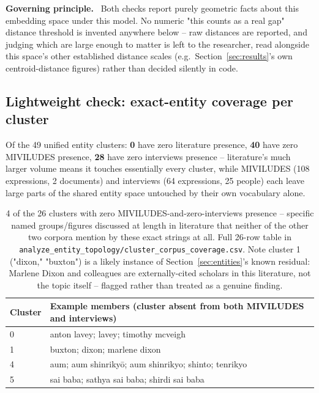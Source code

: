 \documentclass[11pt,a4paper]{article}
\newenvironment{plainbox}[1][Note]
  {\par\vspace{6pt}\noindent{\color{noteline}\rule{\linewidth}{0.6pt}}\par\vspace{3pt}
   \noindent\small\textbf{#1.}\ \ignorespaces}
  {\par\vspace{3pt}\noindent{\color{noteline}\rule{\linewidth}{0.6pt}}\vspace{6pt}\par}
\begin{document}
\begin{plainbox}[Governing principle]
Both checks report purely geometric facts about this embedding space
under this model. No numeric "this counts as a real gap" distance
threshold is invented anywhere below -- raw distances are reported, and
judging which are large enough to matter is left to the researcher,
read alongside this space's other established distance scales (e.g.\
Section~\ref{sec:results}'s own centroid-distance figures) rather than
decided silently in code.
\end{plainbox}

\subsection{Lightweight check: exact-entity coverage per cluster}

Of the 49 unified entity clusters: \textbf{0} have zero literature
presence, \textbf{40} have zero MIVILUDES presence, \textbf{28} have
zero interviews presence -- literature's much larger volume means it
touches essentially every cluster, while MIVILUDES (108 expressions, 2
documents) and interviews (64 expressions, 25 people) each leave large
parts of the shared entity space untouched by their own vocabulary
alone.

\begin{table}[h!]
\centering
\small
\begin{tabular}{p{0.7cm}p{9.5cm}}
\toprule
Cluster & Example members (cluster absent from both MIVILUDES and interviews) \\
\midrule
0 & anton lavey; lavey; timothy mcveigh \\
1 & buxton; dixon; marlene dixon \\
4 & aum; aum shinriky\={o}; aum shinrikyo; shinto; tenrikyo \\
5 & sai baba; sathya sai baba; shirdi sai baba \\
\bottomrule
\end{tabular}
\caption{4 of the 26 clusters with zero MIVILUDES-and-zero-interviews
presence -- specific named groups/figures discussed at length in
literature that neither of the other two corpora mention by these exact
strings at all. Full 26-row table in
\texttt{analyze\_entity\_topology/cluster\_corpus\_coverage.csv}. Note
cluster 1 ("dixon," "buxton") is a likely instance of
Section~\ref{sec:entities}'s known residual: Marlene Dixon and colleagues
are externally-cited scholars in this literature, not the topic itself
-- flagged rather than treated as a genuine finding.}
\end{table}
\end{document}
